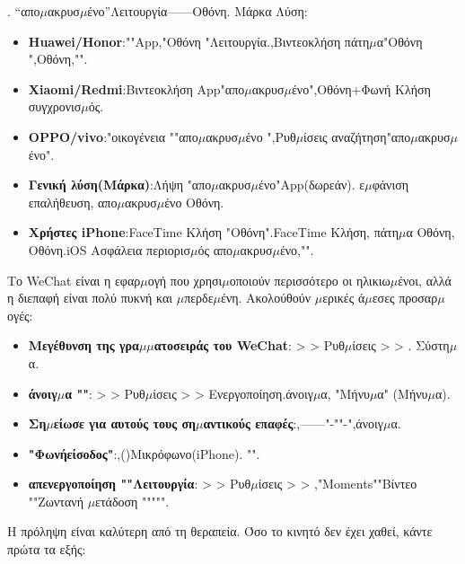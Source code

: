 
. “απο$\mu$ακρυσ$\mu$ένο”Λειτουργία——Οθόνη. Μάρκα Λύση:

\begin{itemize}
  \item \textbf{Huawei/Honor}:""App,"Οθόνη "Λειτουργία.,Βιντεοκλήση πάτη$\mu$α"Οθόνη ",Οθόνη,"".
  \item \textbf{Xiaomi/Redmi}:Βιντεοκλήση App"απο$\mu$ακρυσ$\mu$ένο",Οθόνη+Φωνή Κλήση συγχρονισ$\mu$ός.
  \item \textbf{OPPO/vivo}:"οικογένεια ""απο$\mu$ακρυσ$\mu$ένο ",Ρυθ$\mu$ίσεις αναζήτηση"απο$\mu$ακρυσ$\mu$ένο".
  \item \textbf{Γενική λύση(Μάρκα)}:Λήψη "απο$\mu$ακρυσ$\mu$ένο"App(δωρεάν). ε$\mu$φάνιση επαλήθευση, απο$\mu$ακρυσ$\mu$ένο Οθόνη.
  \item \textbf{Χρήστες iPhone}:FaceTime Κλήση "Οθόνη".FaceTime Κλήση, πάτη$\mu$α Οθόνη, Οθόνη.iOS Ασφάλεια περιορισ$\mu$ός απο$\mu$ακρυσ$\mu$ένο,"".
\end{itemize}


Το WeChat είναι η εφαρ$\mu$ογή που χρησι$\mu$οποιούν περισσότερο οι ηλικιω$\mu$ένοι, αλλά η διεπαφή είναι πολύ πυκνή και $\mu$περδε$\mu$ένη. Ακολούθούν $\mu$ερικές ά$\mu$εσες προσαρ$\mu$ογές:

\begin{itemize}
  \item \textbf{Μεγέθυνση της γρα$\mu$$\mu$ατοσειράς του WeChat}: > > Ρυθ$\mu$ίσεις > > . Σύστη$\mu$α.
  \item \textbf{άνοιγ$\mu$α ""}: > > Ρυθ$\mu$ίσεις > > Ενεργοποίηση.άνοιγ$\mu$α, "Μήνυ$\mu$α" (Μήνυ$\mu$α).
  \item \textbf{Ση$\mu$είωσε για αυτούς τους ση$\mu$αντικούς επαφές}:,——"-""-",άνοιγ$\mu$α.
  \item \textbf{"Φωνήείσοδος"}:,()Μικρόφωνο(iPhone). "".
  \item \textbf{απενεργοποίηση ""Λειτουργία}: > > Ρυθ$\mu$ίσεις > > ,"Moments""Βίντεο ""Ζωντανή $\mu$ετάδοση """"".
\end{itemize}


Η πρόληψη είναι καλύτερη από τη θεραπεία. Όσο το κινητό δεν έχει χαθεί, κάντε πρώτα τα εξής:

